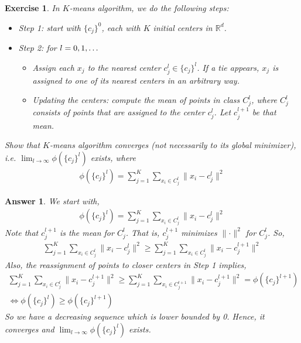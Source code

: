 \documentclass[12pt]{article}
\theoremstyle{colon}
\newtheorem{exercise}{Exercise}
\newtheorem*{answer}{Answer}
\begin{document}
\clearpage

\begin{exercise}
  In $K$-means algorithm, we do the following steps:
  \begin{itemize}
    \item Step 1: start with $\{ c_j \}^0$, each with $K$ initial centers in $\mathbb{R}^d$.
    \item Step 2: for $l = 0,1,\mathellipsis$
      \begin{itemize}
        \item Assign each $x_j$ to the nearest center $c_j^l \in \{ c_j \}^l$. If a tie appears, $x_j$ is assigned to one of its nearest centers in an arbitrary way.
        \item Updating the centers: compute the mean of points in class $C_j^l$, where $C_j^l$ consists of points that are assigned to the center $c_j^l$. Let $c_j^{l+1}$ be that mean.
      \end{itemize}
  \end{itemize}
  Show that $K$-means algorithm converges (not necessarily to its global minimizer), i.e. $\lim_{l \rightarrow \infty} \phi(\{c_j\}^l)$ exists, where
  \begin{gather*}
    \phi(\{c_j\}^l) = \sum_{j=1}^K \sum_{x_i \in C_j^l} \lVert x_i - c_j^l \rVert^2
  \end{gather*}
\end{exercise}

\begin{answer}
  We start with,
  \begin{gather*}
    \phi(\{c_j\}^l) = \sum_{j=1}^K \sum_{x_i \in C_j^l} \lVert x_i - c_j^l \rVert^2
  \end{gather*}
  Note that $c_j^{l+1}$ is the mean for $C_j^l$. That is, $c_j^{l+1}$ minimizes $\lVert \cdot \rVert^2$ for $C_j^l$. So,
  \begin{gather*}
    \sum_{j=1}^K \sum_{x_i \in C_j^l} \lVert x_i - c_j^l \rVert^2 \geq \sum_{j=1}^K \sum_{x_i \in C_j^l} \lVert x_i - c_j^{l+1} \rVert^2
  \end{gather*}
  Also, the reassignment of points to closer centers in Step 1 implies,
  \begin{gather*}
    \sum_{j=1}^K \sum_{x_i \in C_j^l} \lVert x_i - c_j^{l+1} \rVert^2 \geq \sum_{j=1}^K \sum_{x_i \in C_j^{l+1}} \lVert x_i - c_j^{l+1} \rVert^2 = \phi(\{c_j\}^{l+1}) \\
    \Longleftrightarrow \phi(\{c_j\}^l) \geq \phi(\{c_j\}^{l+1})
  \end{gather*}
  So we have a decreasing sequence which is lower bounded by 0. Hence, it converges and $\lim_{l \rightarrow \infty} \phi(\{c_j\}^l)$ exists.
\end{answer}
\end{document}
